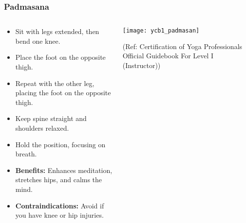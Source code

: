 \begin{frame}[fragile]\frametitle{Padmasana}
\begin{columns}
    \begin{column}[T]{0.5\linewidth}
      \begin{itemize}
        \item Sit with legs extended, then bend one knee.
        \item Place the foot on the opposite thigh.
        \item Repeat with the other leg, placing the foot on the opposite thigh.
        \item Keep spine straight and shoulders relaxed.
        \item Hold the position, focusing on breath.
        \item \textbf{Benefits:} Enhances meditation, stretches hips, and calms the mind.
        \item \textbf{Contraindications:} Avoid if you have knee or hip injuries.
      \end{itemize}
    \end{column}
    \begin{column}[T]{0.5\linewidth}
        \begin{center}
        \begin{center}
		        \texttt{[image: ycb1\_padmasan]}
				
				{\tiny (Ref: Certification  of Yoga Professionals Official Guidebook For Level I (Instructor))}	        
		\end{center}   
        \end{center}    
    \end{column}
  \end{columns}
\end{frame}

